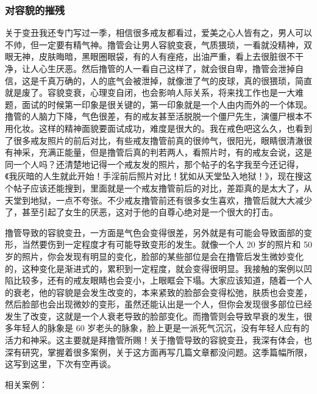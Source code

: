 \documentclass{ctexart}
\begin{document}
\subsubsection{对容貌的摧残}

关于变丑我还专门写过一季，相信很多戒友都看过，爱美之心人皆有之，男人可以不帅，但一定要有精气神。撸管会让男人容貌变衰，气质猥琐，一看就没精神，双眼无神，皮肤晦暗，黑眼圈眼袋，有的人有痤疮，出油严重，看上去很脏很不干净，让人心生厌恶。然后撸管的人一看自己这样了，就会很自卑，撸管会泄掉自信，这是千真万确的，人的底气会被泄掉，就像泄了气的皮球，真的很猥琐，简直就是废了。容貌变衰，心理变自闭，也会影响人际关系，将来找工作也是一大难题，面试的时候第一印象是很关键的，第一印象就是一个人由内而外的一个体现。撸管的人脑力下降，气色很差，有的戒友甚至活脱脱一个僵尸先生，演僵尸根本不用化妆。这样的精神面貌要面试成功，难度是很大的。我在戒色吧这么久，也看到了很多戒友照片的前后对比，有些戒友撸管前真的很帅气，很阳光，眼睛很清澈很有神采，充满正能量，但是撸管后真的判若两人，看照片时，有的戒友会说，这是同一个人吗？还清楚地记得一个戒友发的照片，那个帖子的名字我至今还记得，《我灰暗的人生就此开始！手淫前后照片对比！犹如从天堂坠入地狱！》，现在搜这个帖子应该还能搜到，里面就是一个戒友撸管前后的对比，差距真的是太大了，从天堂到地狱，一点不夸张。不少戒友撸管前还有很多女生喜欢，撸管后就大大减少了，甚至引起了女生的厌恶，这对于他的自尊心绝对是一个很大的打击。

撸管导致的容貌变丑，一方面是气色会变得很差，另外就是有可能会导致面部的变形，当然要伤到一定程度才有可能导致变形的发生。就像一个人 20 岁的照片和 50 岁的照片，你会发现有明显的变化，脸部的某些部位是会在撸管后发生微妙变化的，这种变化是渐进式的，累积到一定程度，就会变得很明显。我接触的案例以凹陷比较多，还有的戒友眼睛也会变小，上眼眶会下塌。大家应该知道，随着一个人的衰老，他的容貌是会发生改变的，本来紧致的脸部会变得松弛，肤质也会变差，然后脸部也会出现微妙的变形，虽然还能认出是一个人，但你会发现很多部位已经发生了改变，这就是一个人衰老导致的脸部变化。而撸管则会导致早衰的发生，很多年轻人的脉象是 60 岁老头的脉象，脸上更是一派死气沉沉，没有年轻人应有的活力和神采。这主要就是拜撸管所赐！关于撸管导致的容貌变丑，我深有体会，也深有研究，掌握着很多案例，关于这方面再写几篇文章都没问题。这季篇幅所限，这写到这里，下次有空再谈。

相关案例：
\end{document}

